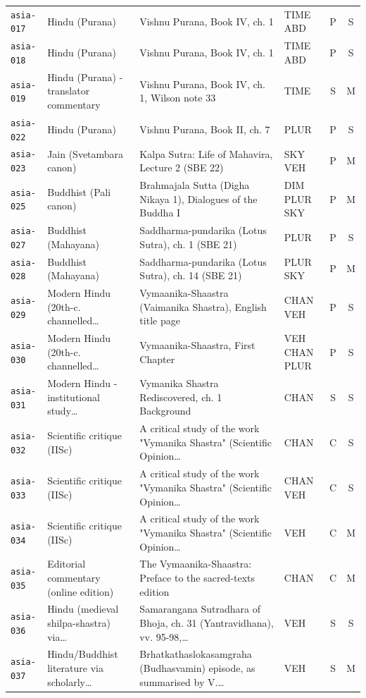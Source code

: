 \documentclass[11pt,a4paper]{article}
\begin{document}
\begin{longtable}{@{}p{1.6cm}p{3.6cm}p{6.9cm}p{2.1cm}cc@{}}
\texttt{asia-017} & Hindu (Purana) & Vishnu Purana, Book IV, ch. 1 & TIME ABD & P & S \\
\texttt{asia-018} & Hindu (Purana) & Vishnu Purana, Book IV, ch. 1 & TIME ABD & P & S \\
\texttt{asia-019} & Hindu (Purana) - translator commentary & Vishnu Purana, Book IV, ch. 1, Wilson note 33 & TIME & S & M \\
\texttt{asia-022} & Hindu (Purana) & Vishnu Purana, Book II, ch. 7 & PLUR & P & S \\
\texttt{asia-023} & Jain (Svetambara canon) & Kalpa Sutra: Life of Mahavira, Lecture 2 (SBE 22) & SKY VEH & P & M \\
\texttt{asia-025} & Buddhist (Pali canon) & Brahmajala Sutta (Digha Nikaya 1), Dialogues of the Buddha I & DIM PLUR SKY & P & M \\
\texttt{asia-027} & Buddhist (Mahayana) & Saddharma-pundarika (Lotus Sutra), ch. 1 (SBE 21) & PLUR & P & S \\
\texttt{asia-028} & Buddhist (Mahayana) & Saddharma-pundarika (Lotus Sutra), ch. 14 (SBE 21) & PLUR SKY & P & M \\
\texttt{asia-029} & Modern Hindu (20th-c. channelled… & Vymaanika-Shaastra (Vaimanika Shastra), English title page & CHAN VEH & P & S \\
\texttt{asia-030} & Modern Hindu (20th-c. channelled… & Vymaanika-Shaastra, First Chapter & VEH CHAN PLUR & P & S \\
\texttt{asia-031} & Modern Hindu - institutional study… & Vymanika Shastra Rediscovered, ch. 1 Background & CHAN & S & S \\
\texttt{asia-032} & Scientific critique (IISc) & A critical study of the work "Vymanika Shastra" (Scientific Opinion… & CHAN & C & S \\
\texttt{asia-033} & Scientific critique (IISc) & A critical study of the work "Vymanika Shastra" (Scientific Opinion… & CHAN VEH & C & S \\
\texttt{asia-034} & Scientific critique (IISc) & A critical study of the work "Vymanika Shastra" (Scientific Opinion… & VEH & C & M \\
\texttt{asia-035} & Editorial commentary (online edition) & The Vymaanika-Shaastra: Preface to the sacred-texts edition & CHAN & C & M \\
\texttt{asia-036} & Hindu (medieval shilpa-shastra) via… & Samarangana Sutradhara of Bhoja, ch. 31 (Yantravidhana), vv. 95-98,… & VEH & S & S \\
\texttt{asia-037} & Hindu/Buddhist literature via scholarly… & Brhatkathaslokasamgraha (Budhasvamin) episode, as summarised by V.… & VEH & S & M \\

\end{longtable}
\end{document}
